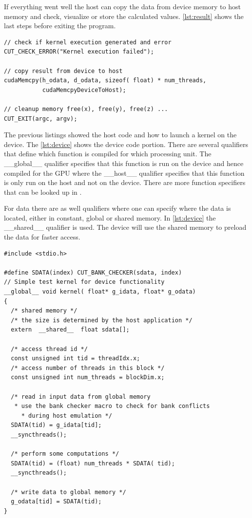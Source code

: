 If everything went well the host can copy the data from device memory
to host memory and check, visualize or store the calculated values.
\autoref{lst:result} shows the last steps before exiting the program.

\begin{lstlisting}[caption=Retrieving of the Results, label=lst:result]
// check if kernel execution generated and error
CUT_CHECK_ERROR("Kernel execution failed");
 
// copy result from device to host
cudaMemcpy(h_odata, d_odata, sizeof( float) * num_threads, 
           cudaMemcpyDeviceToHost);

// cleanup memory free(x), free(y), free(z) ...
CUT_EXIT(argc, argv);
\end{lstlisting} 

The previous listings showed the host code and how to launch a kernel on the
device. The \autoref{lst:device} shows the device code portion. There are
several qualifiers that define which function is compiled for which processing
unit. The \textsf{\_\_global\_\_} qualifier specifies that this function is run
on the device and hence compiled for the \gls{GPU} where the
\textsf{\_\_host\_\_} qualifier specifies that this function is only run on the
host and not on the device. There are more function specifiers that can be
looked up in \citep{citeulike:3325943}.

For data there are as well qualifiers where one can specify where the data is
located, either in constant, global or shared memory. In \autoref{lst:device}
the \textsf{\_\_shared\_\_} qualifier is used. The device will use the shared
memory to preload the data for faster access.

\begin{lstlisting}[caption=CUDA device code, label=lst:device]
#include <stdio.h>

#define SDATA(index) CUT_BANK_CHECKER(sdata, index)
// Simple test kernel for device functionality
__global__ void kernel( float* g_idata, float* g_odata) 
{
  /* shared memory */
  /* the size is determined by the host application */
  extern  __shared__  float sdata[];

  /* access thread id */
  const unsigned int tid = threadIdx.x;
  /* access number of threads in this block */
  const unsigned int num_threads = blockDim.x;

  /* read in input data from global memory
   * use the bank checker macro to check for bank conflicts
 	 * during host emulation */
  SDATA(tid) = g_idata[tid];
  __syncthreads();

  /* perform some computations */
  SDATA(tid) = (float) num_threads * SDATA( tid);
  __syncthreads();

  /* write data to global memory */
  g_odata[tid] = SDATA(tid);
} 
\end{lstlisting} 


